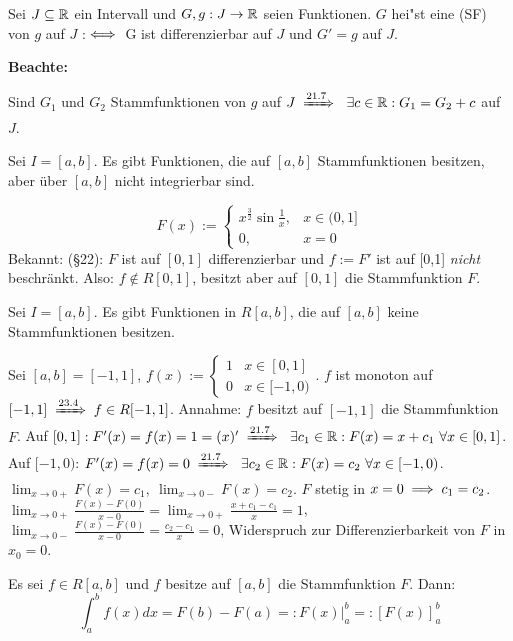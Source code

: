 \documentclass[a4paper,oneside,DIV15,BCOR12mm]{scrbook}
\begin{document}
\begin{definition}
Sei $J\subseteq\mathbb{R}$ ein Intervall und $G,g: J\to\mathbb{R}$ seien Funktionen. $G$ hei"st eine  (SF) von $g$ auf $J$ :$\iff$ G ist differenzierbar auf $J$ und $G'=g$ auf $J$.\\
\end{definition}
\textbf{Beachte:}
\begin{liste}
\item Sind $G_1$ und $G_2$ Stammfunktionen von $g$ auf $J \folgtnach{21.7}\ \exists c \in\MdR: G_1=G_2+c$ auf $J$.
\item Sei $I=[a,b]$. Es gibt Funktionen, die auf $[a,b]$ Stammfunktionen besitzen, aber über $[a,b]$ nicht integrierbar sind.
\begin{beispiel}
$$F(x) := \begin{cases}
x^{\frac{3}{2}} \sin\frac{1}{x},&x\in(0,1]\\
0,& x=0\end{cases}$$
Bekannt: (§22): $F$ ist auf $[0,1]$ differenzierbar und $f:=F'$ ist auf [0,1] \emph{nicht} beschränkt. Also: $f \notin R[0,1]$, besitzt aber auf $[0,1]$ die Stammfunktion $F$.
\end{beispiel}
\item Sei $I=[a,b]$. Es gibt Funktionen in $R[a,b]$, die auf $[a,b]$ keine Stammfunktionen besitzen.
\begin{beispiel}
Sei $[a,b]=[-1,1]$, $f(x):=\begin{cases}
1&x\in[0,1]\\
0&x\in[-1,0)\end{cases}$. $f$ ist monoton auf $[-1,1]\folgtnach{23.4}f\in R[-1,1]$. Annahme: $f$ besitzt auf $[-1, 1]$ die Stammfunktion $F$. Auf $[0,1]:F'(x)=f(x)=1=(x)'\folgtnach{21.7}\ \exists c_1 \in \MdR: F(x)=x+c_1\ \forall x \in [0,1]$. Auf $[-1, 0)$: $F'(x)=f(x)=0 \folgtnach{21.7}\ \exists c_2 \in \MdR: F(x)=c_2\ \forall x\in [-1,0)$. $\displaystyle\lim_{x\to 0+}F(x)=c_1,\ \displaystyle\lim_{x\to 0-}F(x)=c_2$. $F$ stetig in $x=0\implies c_1=c_2$.$\displaystyle\lim_{x \to 0+}\frac{F(x)-F(0)}{x-0}=\displaystyle\lim_{x\to 0+}\frac{x+c_1-c_1}{x}=1$, $\displaystyle\lim_{x\to 0-}\frac{F(x)-F(0)}{x-0}=\frac{c_2-c_1}{x}=0$, Widerspruch zur Differenzierbarkeit von $F$ in $x_0=0$.
\end{beispiel}
\end{liste}

\begin{satz}
Es sei $f\in R[a,b]$ und $f$ besitze auf $[a,b]$ die Stammfunktion $F$. Dann: 
$$\int_a^bf(x)dx = F(b) - F(a) =: F(x)|_a^b =: [F(x)]_a^b$$
\end{satz}
\end{document}
